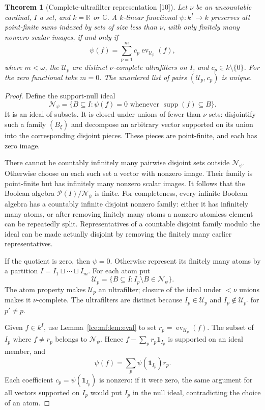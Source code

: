 \documentclass[11pt,letterpaper]{article}
\numberwithin{equation}{section}
\newtheorem{theorem}{Theorem}[section]
\theoremstyle{definition}
\theoremstyle{remark}
\newcommand{\R}{\mathbb R}
\newcommand{\C}{\mathbb C}
\newcommand{\supp}{\operatorname{supp}}
\newcommand{\Pow}{\mathcal P}
\newcommand{\leref}[1]{Lemma~\ref{#1}}
\newcommand{\src}[1]{\textup{\textsf{\small[#1]}}}%
\newcommand{\ev}{\operatorname{ev}}
\begin{document}
\begin{theorem}[Complete-ultrafilter representation \src{10}]\label{lce:mf:thm:product}
Let $\nu$ be an uncountable cardinal, $I$ a set, and $k=\R$ or $\C$. A
$k$-linear functional $\psi:k^I\to k$ preserves all point-finite sums
indexed by sets of size less than $\nu$, with only finitely many nonzero
scalar images, if and only if
\begin{equation}\label{lce:mf:eq:ultrarep}
 \psi(f)=\sum_{p=1}^mc_p\ev_{\mathcal U_p}(f),
\end{equation}
where $m<\omega$, the $\mathcal U_p$ are distinct $\nu$-complete ultrafilters
on $I$, and $c_p\in k\setminus\{0\}$. For the zero functional take $m=0$. The
unordered list of pairs $(\mathcal U_p,c_p)$ is unique.
\end{theorem}
\begin{proof}
Define the support-null ideal
\[
 \mathcal N_\psi=\{B\subseteq I:\psi(f)=0
          \text{ whenever }\supp(f)\subseteq B\}.
\]
It is an ideal of subsets. It is closed under unions of fewer than $\nu$
sets: disjointify such a family $(B_\xi)$ and decompose an arbitrary vector
supported on its union into the corresponding disjoint pieces. These pieces
are point-finite, and each has zero image.

There cannot be countably infinitely many pairwise disjoint sets outside
$\mathcal N_\psi$. Otherwise choose on each such set a vector with nonzero
image. Their family is point-finite but has infinitely many nonzero scalar
images. It follows that the Boolean algebra $\Pow(I)/\mathcal N_\psi$ is
finite. For completeness, every infinite Boolean algebra has a countably
infinite disjoint nonzero family: either it has infinitely many atoms, or
after removing finitely many atoms a nonzero atomless element can be
repeatedly split. Representatives of a countable disjoint family modulo the
ideal can be made actually disjoint by removing the finitely many earlier
representatives.

If the quotient is zero, then $\psi=0$. Otherwise represent its finitely
many atoms by a partition $I=I_1\sqcup\cdots\sqcup I_m$. For each atom put
\[
 \mathcal U_p=\{B\subseteq I:I_p\setminus B\in\mathcal N_\psi\}.
\]
The atom property makes $\mathcal U_p$ an ultrafilter; closure of the ideal
under ${<}\nu$ unions makes it $\nu$-complete. The ultrafilters are
distinct because $I_p\in\mathcal U_p$ and $I_p\notin\mathcal U_{p'}$ for
$p'\ne p$.

Given $f\in k^I$, use \leref{lce:mf:lem:eval} to set
$r_p=\ev_{\mathcal U_p}(f)$. The subset of $I_p$ where $f\ne r_p$ belongs to
$\mathcal N_\psi$. Hence $f-\sum_pr_p\mathbf 1_{I_p}$ is supported on an
ideal member, and
\[
 \psi(f)=\sum_p\psi(\mathbf 1_{I_p})r_p.
\]
Each coefficient $c_p=\psi(\mathbf 1_{I_p})$ is nonzero: if it were zero,
the same argument for all vectors supported on $I_p$ would put $I_p$ in the
null ideal, contradicting the choice of an atom.


\end{proof}
\end{document}
